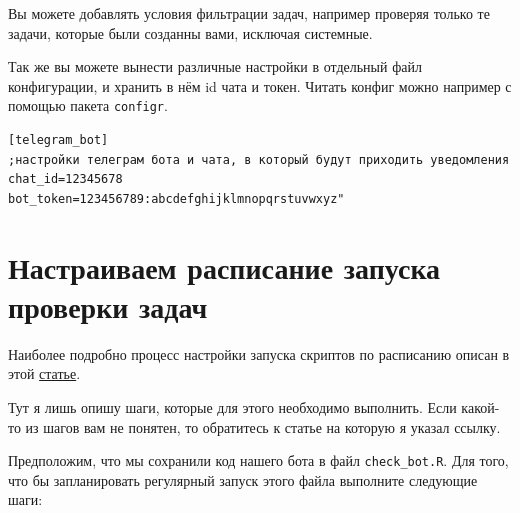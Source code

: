 \documentclass[
]{book}
\newenvironment{Shaded}{\begin{snugshade}}{\end{snugshade}}
\newcommand{\AttributeTok}[1]{\textcolor[rgb]{0.13,0.29,0.53}{#1}}
\newcommand{\CommentTok}[1]{\textcolor[rgb]{0.56,0.35,0.01}{\textit{#1}}}
\newcommand{\ConstantTok}[1]{\textcolor[rgb]{0.56,0.35,0.01}{#1}}
\newcommand{\FunctionTok}[1]{\textcolor[rgb]{0.13,0.29,0.53}{\textbf{#1}}}
\newcommand{\NormalTok}[1]{#1}
\newcommand{\OtherTok}[1]{\textcolor[rgb]{0.56,0.35,0.01}{#1}}
\newcommand{\SpecialCharTok}[1]{\textcolor[rgb]{0.81,0.36,0.00}{\textbf{#1}}}
\newcommand{\StringTok}[1]{\textcolor[rgb]{0.31,0.60,0.02}{#1}}
\begin{document}
Вы можете добавлять условия фильтрации задач, например проверяя только те задачи, которые были созданны вами, исключая системные.

Так же вы можете вынести различные настройки в отдельный файл конфигурации, и хранить в нём id чата и токен. Читать конфиг можно например с помощью пакета \texttt{configr}.

\begin{verbatim}
[telegram_bot]
;настройки телеграм бота и чата, в который будут приходить уведомления
chat_id=12345678
bot_token=123456789:abcdefghijklmnopqrstuvwxyz"
\end{verbatim}

\begin{Shaded}
\end{Shaded}

\section{Настраиваем расписание запуска проверки задач}\label{ux43dux430ux441ux442ux440ux430ux438ux432ux430ux435ux43c-ux440ux430ux441ux43fux438ux441ux430ux43dux438ux435-ux437ux430ux43fux443ux441ux43aux430-ux43fux440ux43eux432ux435ux440ux43aux438-ux437ux430ux434ux430ux447}

Наиболее подробно процесс настройки запуска скриптов по расписанию описан в этой \href{https://netpeak.net/ru/blog/kak-nastroit-zapusk-r-skripta-po-raspisaniyu/}{статье}.

Тут я лишь опишу шаги, которые для этого необходимо выполнить. Если какой-то из шагов вам не понятен, то обратитесь к статье на которую я указал ссылку.

Предположим, что мы сохранили код нашего бота в файл \texttt{check\_bot.R}. Для того, что бы запланировать регулярный запуск этого файла выполните следующие шаги:
\end{document}
